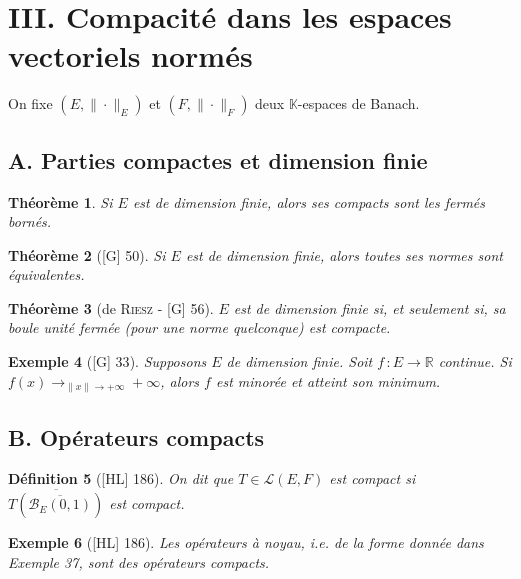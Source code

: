 \documentclass[10pt, a4paper, parskip=full, twoside, twocolumn]{report}
\newtheorem{definition}{Définition}
\newtheorem{theorem}[definition]{Théorème}
\newtheorem{example}[definition]{Exemple}
\newcommand{\IK}{\mathbb{K}}
\newcommand{\IR}{\mathbb{R}}
\newcommand{\B}{\mathcal{B}}
\begin{document}
\section*{III. Compacité dans les espaces vectoriels normés}
\textcolor{paragraphtext}{On fixe $(E,\|\cdot \|_E)$ et $(F,\|\cdot\|_F)$ deux $\IK$-espaces de Banach.}

\subsection*{A. Parties compactes et dimension finie}
\begin{theorem}
	Si $E$ est de dimension finie, alors ses compacts sont les fermés bornés.
\end{theorem}

\begin{tcolorbox}[
    breakable, %
    colback=developpement, %
    colframe=gray!0!black, %
    boxrule=0pt, %
    arc=1mm, %
	boxsep=0pt,
	left=0pt, right=0pt, top=0pt, bottom=0pt
]
\begin{theorem}[\textnormal{[G] 50}]
	\label{203dev21}
	Si $E$ est de dimension finie, alors toutes ses normes sont équivalentes.
\end{theorem}
\begin{theorem}[de \textsc{Riesz} - \textnormal{[G] 56}]
	\label{203dev22}
	$E$ est de dimension finie si, et seulement si, sa boule unité fermée (pour une norme quelconque) est compacte.
\end{theorem}
\end{tcolorbox}

\begin{example}[\textnormal{[G] 33}]
	Supposons $E$ de dimension finie. Soit $f\,\colon E\to \IR$ continue.
	Si $f(x) \to_{\|x\|\to +\infty}+\infty$, alors $f$ est minorée et atteint son minimum.
\end{example}

\subsection*{B. Opérateurs compacts}
\begin{definition}[\textnormal{[HL] 186}]
	On dit que $T\in\mathcal{L}(E,F)$ est \emph{compact} si $\overline{T(\overline{\B_E(0,1)})}$ est compact.
\end{definition}

\begin{example}[\textnormal{[HL] 186}]
	Les opérateurs à noyau, \emph{i.e.} de la forme donnée dans Exemple 37, sont des opérateurs compacts.
\end{example}
\end{document}
